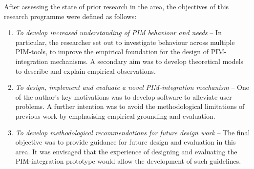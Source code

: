 \newpage
After assessing the state of prior research in the area, the objectives of this research programme were defined as follows:
\begin{enumerate}

\item \textit{To develop increased understanding of PIM behaviour and needs} -- In particular, the researcher set out to investigate behaviour across multiple PIM-tools, to improve the empirical foundation for the design of PIM-integration mechanisms.   A secondary aim was to develop theoretical models to describe and explain empirical observations.

\item \textit{To design, implement and evaluate a novel PIM-integration mechanism} -- One of the author's key motivations was to develop software to alleviate user problems.  A further intention was to avoid the methodological limitations of previous work by emphasising empirical grounding and evaluation.

\item \textit{To develop methodological recommendations for future design work} -- The final objective was to provide guidance for future design and evaluation in this area. It was envisaged that the experience of designing and evaluating the PIM-integration prototype would allow the development of such guidelines.


\end{enumerate}
